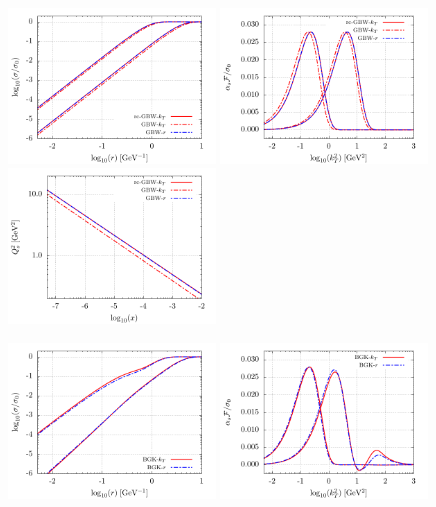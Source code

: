 \documentclass[11pt]{article}
\numberwithin{equation}{section}
\numberwithin{table}{section}
\numberwithin{figure}{section}
\begin{document}
\begin{figure}[p]
  \begin{multicols}{2}
    \includegraphics[width=0.49\textwidth]{./plots/GBW-dipole.pdf}
    \includegraphics[width=0.49\textwidth]{./plots/GBW-gluon.pdf}
    \includegraphics[width=0.49\textwidth]{./plots/GBW-saturation.pdf}\par
    \includegraphics[width=0.49\textwidth]{./plots/BGK-dipole.pdf}
    \includegraphics[width=0.49\textwidth]{./plots/BGK-gluon.pdf}

\end{multicols}
\end{figure}
\end{document}
